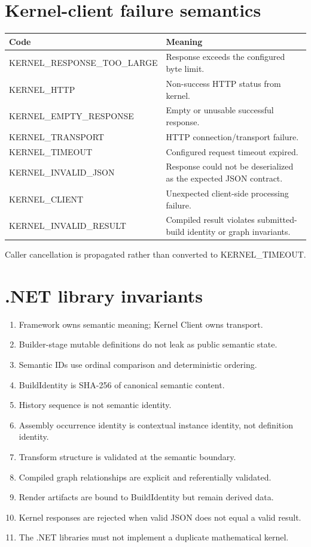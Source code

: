 \documentclass[11pt,a4paper]{report}
\begin{document}
\section{Kernel-client failure semantics}

\begin{tabularx}{\textwidth}{@{}p{}X@{}}
\toprule
Code & Meaning \\
\midrule
KERNEL\_RESPONSE\_TOO\_LARGE & Response exceeds the configured byte limit. \\
KERNEL\_HTTP & Non-success HTTP status from kernel. \\
KERNEL\_EMPTY\_RESPONSE & Empty or unusable successful response. \\
KERNEL\_TRANSPORT & HTTP connection/transport failure. \\
KERNEL\_TIMEOUT & Configured request timeout expired. \\
KERNEL\_INVALID\_JSON & Response could not be deserialized as the expected JSON contract. \\
KERNEL\_CLIENT & Unexpected client-side processing failure. \\
KERNEL\_INVALID\_RESULT & Compiled result violates submitted-build identity or graph invariants. \\
\bottomrule
\end{tabularx}

Caller cancellation is propagated rather than converted to KERNEL\_TIMEOUT.

\section{.NET library invariants}

\begin{enumerate}
\item Framework owns semantic meaning; Kernel Client owns transport.
\item Builder-stage mutable definitions do not leak as public semantic state.
\item Semantic IDs use ordinal comparison and deterministic ordering.
\item BuildIdentity is SHA-256 of canonical semantic content.
\item History sequence is not semantic identity.
\item Assembly occurrence identity is contextual instance identity, not definition identity.
\item Transform structure is validated at the semantic boundary.
\item Compiled graph relationships are explicit and referentially validated.
\item Render artifacts are bound to BuildIdentity but remain derived data.
\item Kernel responses are rejected when valid JSON does not equal a valid result.
\item The .NET libraries must not implement a duplicate mathematical kernel.
\end{enumerate}
\end{document}
